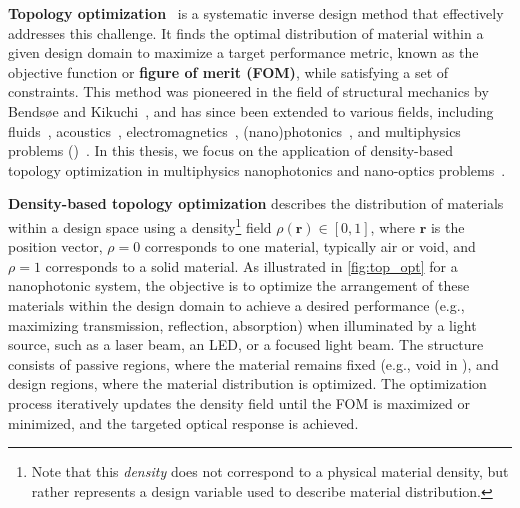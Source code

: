 \textbf{Topology optimization}~\cite{topopt_book} is a systematic inverse design method that effectively addresses this challenge. It finds the optimal distribution of material within a given design domain to maximize a target performance metric,
 known as the objective function or \textbf{figure of merit (FOM)}, while satisfying a set of constraints. This method
was pioneered in the field of structural mechanics by Bendsøe and Kikuchi~\cite{bendsoe_kikukchi}, 
and has since been extended to various fields, including fluids~\cite{topopt_fluid}, acoustics~\cite{topopt_acoustic}, 
electromagnetics~\cite{topopt_EM}, (nano)photonics~\cite{topopt_phot}, and multiphysics problems ()~\cite{coupled_topopt}. In this thesis, we focus on the application of density-based~\cite{bendsoe_density, topopt_approaches} 
topology optimization in multiphysics nanophotonics and nano-optics problems~\cite{jensen_review}.

\textbf{Density-based topology optimization} describes the distribution of materials within a design space using a 
density\footnote{Note that this \emph{density} does not correspond to a physical material density, but rather represents a design variable used to describe material distribution.} field $\rho(\mathbf{r}) \in [0,1]$, where $\mathbf{r}$ is the position vector, $\rho = 0$ corresponds to one material, typically air or void, and $\rho = 1$ corresponds to a solid material.
 As illustrated 
in \autoref{fig:top_opt} for a nanophotonic system, the objective is to optimize the arrangement of these materials within 
the design domain to achieve a desired performance (e.g., maximizing transmission, reflection, absorption) when illuminated by a light source, such as a laser beam, an LED, or a focused light beam. 
The structure consists of passive regions, where the material remains fixed (e.g., void in ), and design regions, where the material distribution 
is optimized. The optimization process iteratively updates the density field until the FOM is maximized or minimized, and the targeted optical response is achieved.

